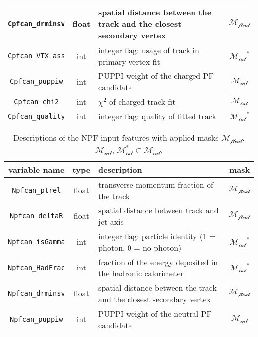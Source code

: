 \begin{table}[h]
\begin{tabularx}{\textwidth}{|c|c|X|c|}
\hline
\texttt{Cpfcan\_drminsv} & float & spatial distance between the track and the closest secondary vertex & \cellcolor{green!50}$\mathcal{M_{\text{float}}}$ \\
\hline
\texttt{Cpfcan\_VTX\_ass} & int & integer flag: usage of track in primary vertex fit & \cellcolor{orange!50}$\mathcal{M_{\text{int}}}^*$ \\
\hline
\texttt{Cpfcan\_puppiw} & int & PUPPI weight of the charged PF candidate & \cellcolor{red!50}$\mathcal{M_{\text{int}}}$ \\
\hline
\texttt{Cpfcan\_chi2} & int & \( \chi^2 \) of charged track fit & \cellcolor{red!50}$\mathcal{M_{\text{int}}}$ \\
\hline
\texttt{Cpfcan\_quality} & int & integer flag: quality of fitted track & \cellcolor{orange!50}$\mathcal{M_{\text{int}}}^*$ \\
\hline
\end{tabularx}
\label{tab:cpf_input_features}
\end{table}

\newpage
\FloatBarrier
\begin{table}[H]
\centering
\caption{Descriptions of the NPF input features with applied masks $\mathcal{M_{\text{float}}}$, $\mathcal{M_{\text{int}}}$, $\mathcal{M_{\text{int}}^*\subset M_{\text{int}}}$.}
\begin{tabularx}{\textwidth}{|c|c|X|c|}
\hline
\textbf{variable name} & \textbf{type} & \textbf{description} & \textbf{mask} \\
\hline
\texttt{Npfcan\_ptrel} & float & transverse momentum fraction of the track & \cellcolor{green!50}$\mathcal{M_{\text{float}}}$ \\
\hline
\texttt{Npfcan\_deltaR} & float & spatial distance between track and jet axis & \cellcolor{green!50}$\mathcal{M_{\text{float}}}$ \\
\hline
\texttt{Npfcan\_isGamma} & int & integer flag: particle identity (1 = photon, 0 = no photon) & \cellcolor{orange!50}$\mathcal{M_{\text{int}}}^*$ \\
\hline
\texttt{Npfcan\_HadFrac} & int & fraction of the energy deposited in the hadronic calorimeter & \cellcolor{orange!50}$\mathcal{M_{\text{int}}}^*$ \\
\hline
\texttt{Npfcan\_drminsv} & float & spatial distance between the track and the closest secondary vertex & \cellcolor{green!50}$\mathcal{M_{\text{float}}}$ \\
\hline
\texttt{Npfcan\_puppiw} & int & PUPPI weight of the neutral PF candidate & \cellcolor{red!50}$\mathcal{M_{\text{int}}}$ \\
\hline
\end{tabularx}
\label{tab:npf_input_features}
\end{table}

